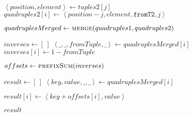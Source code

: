 \begin{frame}[containsverbatim]{\insertionseriesexampleframe}
\begin{columns}[c]
\begin{column}{0.3\textwidth}
{\begin{minipage}[c]{\textwidth}
\begin{algorithm}[H]
\begin{algorithmic}[1]
                                                \State $\left<position, element\right> \gets tuples2{\left[j\right]}$
                                                \State $quadruples2{\left[i\right]} \gets \left<position - j, element, \texttt{fromT2}, j\right>$
                                            \EndFor
                                            
                                            \label{insertionseriesSortMerge before merge}
                                            \State $quadruplesMerged \gets \Call{merge}{quadruples1, quadruples2}$
                                            \label{insertionseriesSortMerge after merge}
                        
                                            \State $inverses \gets \left[\ \right]$
                                                \State $\left<\_, \_, fromTuple, \_\right> \gets quadruplesMerged{\left[i\right]}$
                                                \State $inverses{\left[i\right]} \gets 1 - fromTuple$
                                            \EndFor
                                            \label{insertionseriesSortMerge after inverses}

                                            \label{insertionseriesSortMerge before prefixSum}
                                            \State $offsets \gets \Call{prefixSum}{inverses}$
                                            \label{insertionseriesSortMerge after prefixSum}
                        
                                            \State $result \gets \left[\ \right]$
                                                \State $\left<key, value, \_, \_\right> \gets quadruplesMerged{\left[i\right]}$
                                                
                                                \State $result{\left[i\right]} \gets \left<key + offsets{\left[i\right]}, value\right>$
                                            \EndFor
                                            \label{insertionseriesSortMerge after fix}
                                            
                                            \State \Return $result$
                                        \EndFunction
                                    \end{algorithmic}
                                \end{algorithm}
                            \endgroup
                        \end{minipage}
                    }
                \end{column}


\end{columns}
\end{frame}
